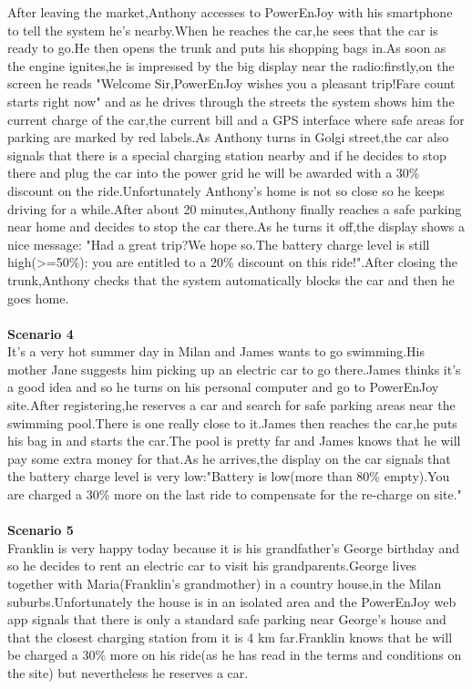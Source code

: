 \documentclass[11pt,a4paper]{report}
\begin{document}
After leaving the market,Anthony accesses to PowerEnJoy with his smartphone to tell the system he's nearby.When he reaches the car,he sees that the car is ready to go.He then opens the trunk and puts his shopping bags in.As soon as the engine ignites,he is impressed by the big display near the radio:firstly,on the screen he reads "Welcome Sir,PowerEnJoy wishes you a pleasant trip!Fare count starts right now" and as he drives through the streets the system shows him the current charge of the car,the current bill and a GPS interface where safe areas for parking are marked by red labels.As Anthony turns in Golgi street,the car also signals that there is a special charging station nearby and if he decides to stop there and plug the car into the power grid he will be awarded with a 30\% discount on the ride.Unfortunately Anthony's home is not so close so he keeps driving for a while.After about 20 minutes,Anthony finally reaches a safe parking near home and decides to stop the car there.As he turns it off,the display shows a nice message: "Had a great trip?We hope so.The battery charge level is still high(>=50\%): you are entitled to a 20\% discount on this ride!".After closing the trunk,Anthony checks that the system automatically blocks the car and then he goes home.\\ \noindent \\
\textbf{Scenario 4}\\
It's a very hot summer day in Milan and James wants to go swimming.His mother Jane suggests him picking up an electric car to go there.James thinks it's a good idea and so he turns on his personal computer and go to PowerEnJoy site.After registering,he reserves a car and search for safe parking areas near the swimming pool.There is one really close to it.James then reaches the car,he puts his bag in and starts the car.The pool is pretty far and James knows that he will pay some extra money for that.As he arrives,the display on the car signals that the battery charge level is very low:"Battery is low(more than 80\% empty).You are charged a 30\% more on the last ride to compensate for the re-charge on site."\\ 
\noindent \\
\textbf{Scenario 5}\\
Franklin is very happy today because it is his grandfather's George birthday and so he decides to rent an electric car to visit his grandparents.George lives together with Maria(Franklin's grandmother) in a country house,in the Milan suburbs.Unfortunately the house is in an isolated area and the PowerEnJoy web app signals that there is only a standard safe parking near George's house and that the closest charging station from it is 4 km far.Franklin knows that he will be charged a 30\% more on his ride(as he has read in the terms and conditions on the site) but nevertheless he reserves a car.\\
\end{document}
